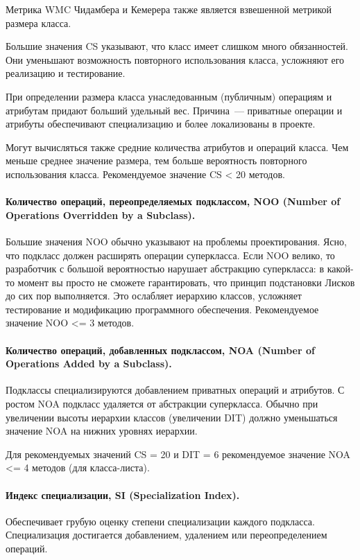 \documentclass{../../text-style}
\begin{document}
Метрика WMC Чидамбера и Кемерера также является взвешенной метрикой размера класса.

Большие значения CS указывают, что класс имеет слишком много обязанностей. Они уменьшают возможность повторного использования класса, усложняют его реализацию и тестирование.

При определении размера класса унаследованным (публичным) операциям и атрибутам придают больший удельный вес. Причина~--- приватные операции и атрибуты обеспечивают специализацию и более локализованы в проекте.

Могут вычисляться также средние количества атрибутов и операций класса. Чем меньше среднее значение размера, тем больше вероятность повторного использования класса. 
Рекомендуемое значение CS < 20 методов.

\paragraph{Количество операций, переопределяемых подклассом, NOO (Number of Operations Overridden by a Subclass).} Большие значения NOO обычно указывают на проблемы проектирования. Ясно, что подкласс должен расширять операции суперкласса. Если NOO велико, то разработчик с большой вероятностью нарушает абстракцию суперкласса: в какой-то момент вы просто не сможете гарантировать, что принцип подстановки Лисков до сих пор выполняется.  Это ослабляет иерархию классов, усложняет тестирование и модификацию программного обеспечения.
Рекомендуемое значение NOO <= 3 методов.

\paragraph{Количество операций, добавленных подклассом, NOA (Number of Operations Added by a Subclass).} Подклассы специализируются добавлением приватных операций и атрибутов. С ро­стом NOA подкласс удаляется от абстракции суперкласса. Обычно при увеличении высоты иерархии классов (увеличении DIT) должно уменьшаться значение NOA на нижних уровнях иерархии.

Для рекомендуемых значений CS = 20 и DIT = 6 рекомендуемое значение NOA <= 4 методов (для класса-листа).

\paragraph{Индекс специализации, SI (Specialization Index).} Обеспечивает грубую оценку степени специализации каждого подкласса. Специали­зация достигается добавлением, удалением или переопределением операций.
\end{document}
